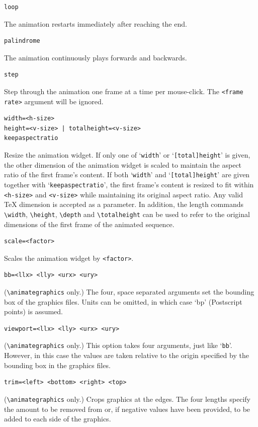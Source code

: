 \documentclass[a4paper]{article}
\begin{document}
\begin{verbatim}
loop
\end{verbatim}
The animation restarts immediately after reaching the end.
\begin{verbatim}
palindrome
\end{verbatim}
The animation continuously plays forwards and backwards.
\begin{verbatim}
step
\end{verbatim}
Step through the animation one frame at a time per mouse-click. The \verb+<frame rate>+ argument will be ignored.
\begin{verbatim}
width=<h-size>
height=<v-size> | totalheight=<v-size>
keepaspectratio
\end{verbatim}
Resize the animation widget. If only one of `\verb+width+' or `\verb+[total]height+' is given, the other dimension of the animation widget is scaled to maintain the aspect ratio of the first frame's content. If both `\verb+width+' and `\verb+[total]height+' are given together with `\verb+keepaspectratio+', the first frame's content is resized to fit within \verb+<h-size>+ and \verb+<v-size>+ while maintaining its original aspect ratio. Any valid \TeX{} dimension is accepted as a parameter. In addition, the length commands \verb+\width+, \verb+\height+, \verb+\depth+ and \verb+\totalheight+ can be used to refer to the original dimensions of the first frame of the animated sequence.
\begin{verbatim}
scale=<factor>
\end{verbatim}
Scales the animation widget by \verb+<factor>+.
\begin{verbatim}
bb=<llx> <lly> <urx> <ury>
\end{verbatim}
(\verb+\animategraphics+ only.) The four, space separated arguments set the bounding box of the graphics files. Units can be omitted, in which case `bp' (Postscript points) is assumed.
\begin{verbatim}
viewport=<llx> <lly> <urx> <ury>
\end{verbatim}
(\verb+\animategraphics+ only.) This option takes four arguments, just like `\verb+bb+'. However, in this case the values are taken relative to the origin specified by the bounding box in the graphics files.
\begin{verbatim}
trim=<left> <bottom> <right> <top>
\end{verbatim}
(\verb+\animategraphics+ only.) Crops graphics at the edges. The four lengths specify the amount to be removed from or, if negative values have been provided, to be added to each side of the graphics.
\end{document}

